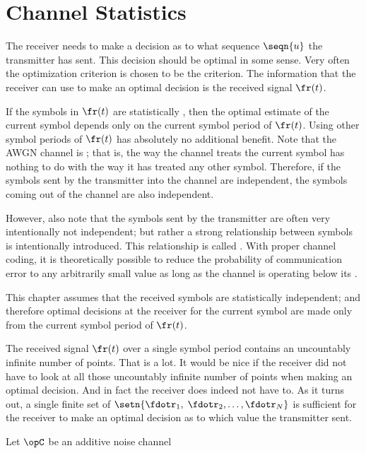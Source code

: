\section{Channel Statistics}
The receiver needs to make a decision as to what
sequence $\seqn{u}$ the transmitter has sent.
This decision should be optimal in some sense.
Very often the optimization criterion is chosen to be
the  criterion.
The information that the receiver can use to make an optimal
decision is the received signal $\fr(t)$.

If the symbols in $\fr(t)$ are statistically ,
then the optimal estimate of the current symbol depends only on the
current symbol period of $\fr(t)$.
Using other symbol periods of $\fr(t)$ has absolutely no
additional benefit.
Note that the AWGN channel is ;
that is, the way the channel treats the current symbol has
nothing to do with the way it has treated any other symbol.
Therefore, if the symbols sent by the transmitter into the channel
are independent, the symbols coming out of the channel are also
independent.

However, also note that the symbols sent by the transmitter
are often very intentionally not independent;
but rather a strong relationship between symbols is intentionally
introduced. This relationship is called .
With proper channel coding, it is theoretically possible
to reduce the probability of communication error to any
arbitrarily small value as long as the channel is operating below its
.

This chapter assumes that the received symbols are
statistically independent;
and therefore optimal decisions at the receiver
for the current symbol are made
only from the current symbol period of $\fr(t)$.

The received signal $\fr(t)$ over a single symbol period
contains an uncountably infinite number of points.
That is a lot.
It would be nice if the receiver did not have to look
at all those uncountably infinite number of points
when making an optimal decision.
And in fact the receiver does indeed not have to.
As it turns out, a single finite set of 
$\setn{\fdotr_1,\;\fdotr_2,\ldots,\fdotr_N}$
is sufficient for the receiver to make an optimal decision as to
which value the transmitter sent.

\begin{definition}
\label{def:chan_stats}
Let $\opC$ be an additive noise channel
\end{definition}




